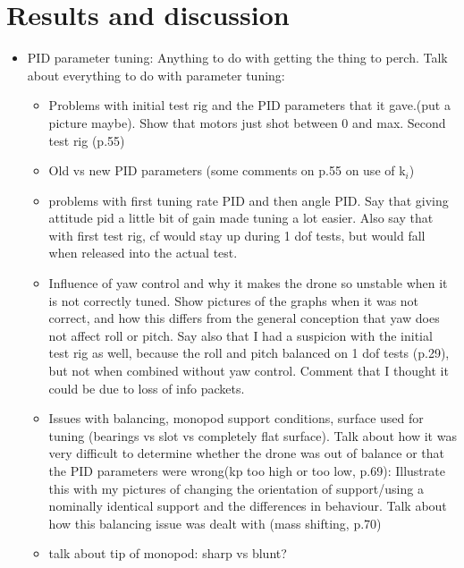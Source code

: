 \documentclass[12pt,a4paper]{article}
\begin{document}
\section{Results and discussion} \label{Results and discussion}
\begin{itemize}
\item PID parameter tuning: Anything to do with getting the thing to perch. Talk about everything to do with parameter tuning:
\begin{itemize}
\item Problems with initial test rig and the PID parameters that it gave.(put a picture maybe). Show that motors just shot between 0 and max. Second test rig (p.55)
\item Old vs new PID parameters (some comments on p.55 on use of k$_i$)
\item problems with first tuning rate PID and then angle PID. Say that giving attitude pid a little bit of gain made tuning a lot easier. Also say that with first test rig, cf would stay up during 1 dof tests, but would fall when released into the actual test.
\item Influence of yaw control and why it makes the drone so unstable when it is not correctly tuned. Show pictures of the graphs when it was not correct, and how this differs from the general conception that yaw does not affect roll or pitch. Say also that I had a suspicion with the initial test rig as well, because the roll and pitch balanced on 1 dof tests (p.29), but not when combined without yaw control. Comment that I thought it could be due to loss of info packets.
\item Issues with balancing, monopod support conditions, surface used for tuning (bearings vs slot vs completely flat surface). Talk about how it was very difficult to determine whether the drone was out of balance or that the PID parameters were wrong(kp too high or too low, p.69): Illustrate this with my pictures of changing the orientation of support/using a nominally identical support and the differences in behaviour. Talk about how this balancing issue was dealt with (mass shifting, p.70)
\item talk about tip of monopod: sharp vs blunt?


\end{itemize}
\end{itemize}
\end{document}
